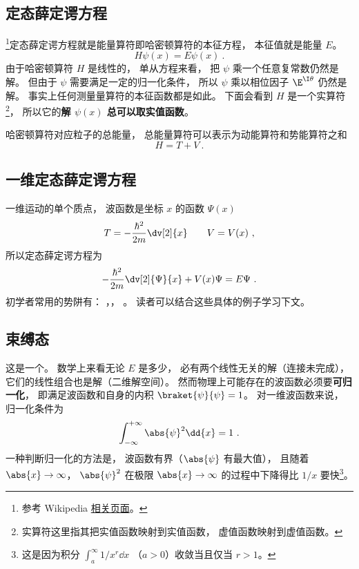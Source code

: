 

\subsection{定态薛定谔方程}
\footnote{参考 Wikipedia \href{https://en.wikipedia.org/wiki/Finite_potential_well}{相关页面}。}定态薛定谔方程就是能量算符即哈密顿算符的本征方程， 本征值就是能量 $E$。
\begin{equation}
H \psi(x) = E \psi(x)~.
\end{equation}
由于哈密顿算符 $H$ 是线性的， 单从方程来看， 把 $\psi$ 乘一个任意复常数仍然是解。 但由于 $\psi$ 需要满足一定的归一化条件， 所以 $\psi$ 乘以相位因子 $\E^{\I\theta}$ 仍然是解。 事实上任何测量量算符的本征函数都是如此。 下面会看到 $H$ 是一个实算符\footnote{实算符这里指其把实值函数映射到实值函数， 虚值函数映射到虚值函数。}， 所以它的\textbf{解 $\psi(x)$ 总可以取实值函数}。

哈密顿算符对应粒子的总能量， 总能量算符可以表示为动能算符和势能算符之和
\begin{equation}
H = T + V~.
\end{equation}

\subsection{一维定态薛定谔方程}
一维运动的单个质点， 波函数是坐标 $x$ 的函数 $\Psi(x)$
\begin{equation}
T = -\frac{\hbar^2}{2m} \dv[2]{x} \qquad V = V(x)~,
\end{equation}
所以定态薛定谔方程为
\begin{equation}\label{eq_SchEq_1}
-\frac{\hbar^2}{2m} \dv[2]{\Psi}{x} + V(x)\Psi = E \Psi~.
\end{equation}
初学者常用的势阱有： ，， 。 读者可以结合这些具体的例子学习下文。

\subsection{束缚态}
这是一个。 数学上来看无论 $E$ 是多少， 必有两个线性无关的解（连接未完成）， 它们的线性组合也是解（二维解空间）。 然而物理上可能存在的波函数必须要\textbf{可归一化}， 即满足波函数和自身的内积 $\braket{\psi}{\psi} = 1$。 对一维波函数来说， 归一化条件为
\begin{equation}
\int_{-\infty}^{+\infty} \abs{\psi}^2 \dd{x} = 1~.
\end{equation}
一种判断归一化的方法是， 波函数有界（$\abs{\psi}$ 有最大值）， 且随着 $\abs{x} \to \infty$，  $\abs{\psi}^2$ 在极限 $\abs{x}\to\infty$ 的过程中下降得比 $1/x$ 要快\footnote{这是因为积分 $\int_a^\infty 1/x^r \dd{x}$ （$a > 0$）收敛当且仅当 $r > 1$。}。

